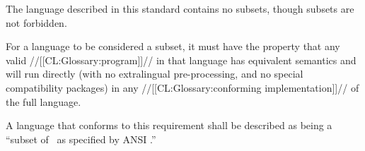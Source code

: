 

 The language described in this standard contains no subsets, though subsets are not forbidden.

For a language to be considered a subset, it must have the property that any valid //[[CL:Glossary:program]]// in that language has equivalent semantics and will run directly (with no extralingual pre-processing, and no special compatibility packages) in any //[[CL:Glossary:conforming implementation]]// of the full language.

A language that conforms to this requirement shall be described as being a ``subset of \clisp\ as specified by ANSI .''
